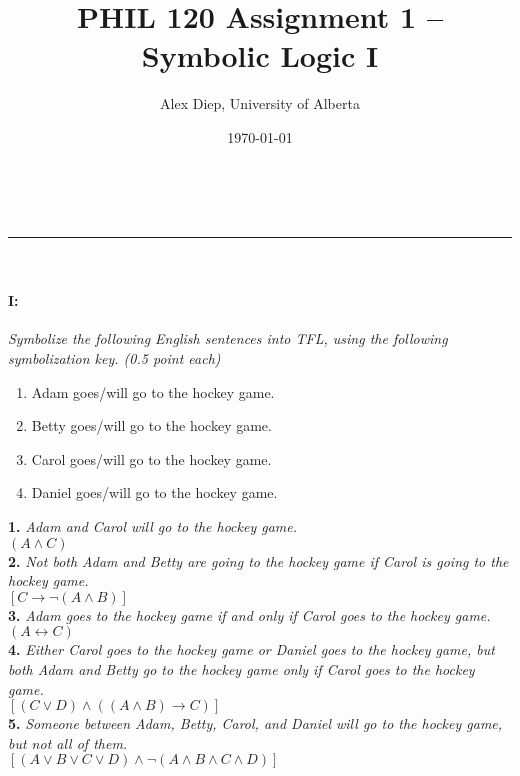 \documentclass[a4paper,11pt]{article}
\makeatletter
\newcommand{\linia}{\rule{\linewidth}{0.5pt}}
\theoremstyle{mytheor}
\renewcommand{\maketitle}{
\begin{center}
\vspace{2ex}
{\huge \textsc{\@title}}
\vspace{1ex}
\\
\linia\\
\@author \hfill \@date
\vspace{4ex}
\end{center}
}
\let\biconditional\leftrightarrow
\makeatother
\begin{document}
\title{PHIL 120 Assignment 1 -- Symbolic Logic I}

\author{Alex Diep, University of Alberta}

\date{\today}

\maketitle

\paragraph{I:} \textit{Symbolize the following English sentences into TFL, using the following symbolization key. (0.5 point each)}
\begin{enumerate}[label=\Alph*:]
    \item Adam goes/will go to the hockey game.
    \item Betty goes/will go to the hockey game.
    \item Carol goes/will go to the hockey game.
    \item Daniel goes/will go to the hockey game.
\end{enumerate}
\textbf{1.} \textit{Adam and Carol will go to the hockey game.} \\
$\boxed{(A \land C)}$ \\[1em]
\textbf{2.} \textit{Not both Adam and Betty are going to the hockey game if Carol is going to the hockey game.} \\
$\boxed{[C \to \neg (A \land B)]}$ \\[1em]
\textbf{3.} \textit{Adam goes to the hockey game if and only if Carol goes to the hockey game.} \\
$\boxed{(A \biconditional C)}$ \\[1em]
\textbf{4.} \textit{Either Carol goes to the hockey game or Daniel goes to the hockey game, but both Adam and Betty go to the hockey game only if Carol goes to the hockey game.} \\
$\boxed{[(C \lor D) \land ((A \land B) \to C)]}$ \\[1em]
\textbf{5.} \textit{Someone between Adam, Betty, Carol, and Daniel will go to the hockey game, but not all of them.} \\
$\boxed{[(A \lor B \lor C \lor D) \land \neg (A \land B \land C \land D)]}$ \\[1em]
\end{document}
